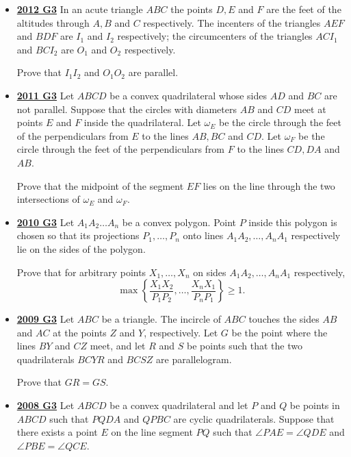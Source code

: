 \documentclass[11pt]{scrartcl}
\begin{document}
\begin{itemize}[leftmargin=*]
Prove that $\varphi \leqslant \max \{  \angle BAC, \angle ABC  \}$.

\item \href{https://artofproblemsolving.com/community/c6h546177p3160579}{\textbf{2012 G3}} In an acute triangle $ABC$ the points $D,E$ and $F$ are the feet of the altitudes through $A,B$ and $C$ respectively. The incenters of the triangles $AEF$ and $BDF$ are $I_1$ and $I_2$ respectively; the circumcenters of the triangles $ACI_1$ and $BCI_2$ are $O_1$ and $O_2$ respectively. 

Prove that $I_1I_2$ and $O_1O_2$ are parallel.
\newpage

\item \href{https://artofproblemsolving.com/community/c6h488827p2739325}{\textbf{2011 G3}} Let $ABCD$ be a convex quadrilateral whose sides $AD$ and $BC$ are not parallel. Suppose that the circles with diameters $AB$ and $CD$ meet at points $E$ and $F$ inside the quadrilateral. Let $\omega_E$ be the circle through the feet of the perpendiculars from $E$ to the lines $AB,BC$ and $CD$. Let $\omega_F$ be the circle through the feet of the perpendiculars from $F$ to the lines $CD,DA$ and $AB$. 

Prove that the midpoint of the segment $EF$ lies on the line through the two intersections of $\omega_E$ and $\omega_F$.
\item \href{https://artofproblemsolving.com/community/c6h418634p2361975}{\textbf{2010 G3}} Let $A_1A_2 \dots A_n$ be a convex polygon. Point $P$ inside this polygon is chosen so that its projections $P_1, \dots , P_n$ onto lines $A_1A_2, \dots , A_nA_1$ respectively lie on the sides of the polygon. 

Prove that for arbitrary points $X_1, \dots , X_n$ on sides $A_1A_2, \dots , A_nA_1$ respectively, \[\max \left\{ \frac{X_1X_2}{P_1P_2}, \dots, \frac{X_nX_1}{P_nP_1} \right\} \geqslant  1.\]
\item \href{https://artofproblemsolving.com/community/c6h355790p1932935}{\textbf{2009 G3}} Let $ABC$ be a triangle. The incircle of $ABC$ touches the sides $AB$ and $AC$ at the points $Z$ and $Y$, respectively. Let $G$ be the point where the lines $BY$ and $CZ$ meet, and let $R$ and $S$ be points such that the two quadrilaterals $BCYR$ and $BCSZ$ are parallelogram. 

Prove that $GR=GS$.
\item \href{https://artofproblemsolving.com/community/c6h287865p1555919}{\textbf{2008 G3}} 	Let $ ABCD$ be a convex quadrilateral and let $ P$ and $ Q$ be points in $ ABCD$ such that $ PQDA$ and $ QPBC$ are cyclic quadrilaterals. Suppose that there exists a point $ E$ on the line segment $ PQ$ such that $ \angle PAE = \angle QDE$ and $ \angle PBE = \angle QCE$. 


\end{itemize}
\end{document}

